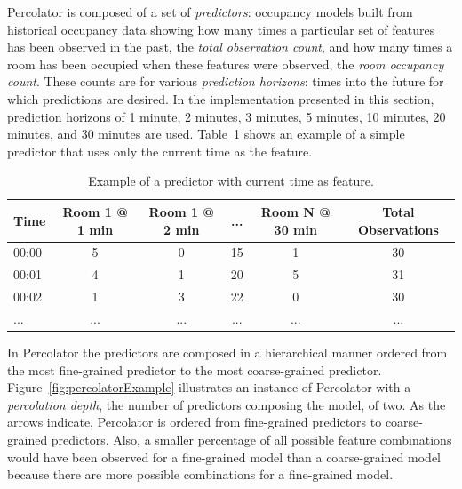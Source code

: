 
Percolator is composed of a set of {\em predictors}: occupancy models built from
historical occupancy data showing how many times a particular set of features
has been observed in the past, the {\em total observation count}, and how many
times a room has been occupied when these features were observed, the {\em room
occupancy count}. These counts are for various {\em prediction horizons}: times
into the future for which predictions are desired. In the implementation
presented in this section, prediction horizons of 1 minute, 2 minutes, 3
minutes, 5 minutes, 10 minutes, 20 minutes, and 30 minutes are
used. Table~\ref{table:curTimePredictor} shows an example of a simple predictor
that uses only the current time as the feature.

\begin{table}[!htb]
  \caption{Example of a predictor with current time as feature.}
  \centering
  \begin{tabular}{| l | c | c | c | c | c |}
    \hline
    Time & Room 1 @ 1 min & Room 1 @ 2 min & ... & Room N @ 30 min & Total Observations\\ \hline
    00:00 & 5 & 0 & 15 & 1 & 30 \\ \hline
    00:01 & 4 & 1 & 20 & 5 & 31  \\ \hline
    00:02 & 1 & 3 & 22 & 0 & 30 \\ \hline
    ... & ... & ... & ... & ... & ... \\
    \hline
  \end{tabular}
  \label{table:curTimePredictor}
\end{table}

In Percolator the predictors are composed in a hierarchical manner ordered from the most
fine-grained predictor to the most coarse-grained
predictor. Figure~\ref{fig:percolatorExample} illustrates an instance of
Percolator with a {\em percolation depth}, the number of predictors composing
the model, of two. As the arrows indicate, Percolator is ordered from
fine-grained predictors to coarse-grained predictors. Also, a smaller percentage
of all possible feature combinations would have been observed for a fine-grained
model than a coarse-grained model because there are more possible combinations
for a fine-grained model. 

